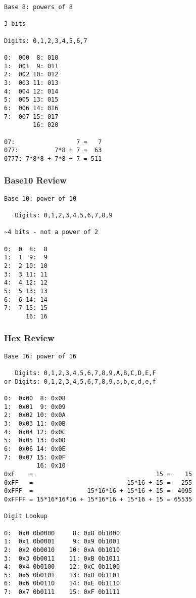 \documentclass[11pt]{article}
\begin{document}
\begin{verbatim}
Base 8: powers of 8

3 bits

Digits: 0,1,2,3,4,5,6,7

0:  000  8: 010
1:  001  9: 011   
2:  002 10: 012   
3:  003 11: 013   
4:  004 12: 014  
5:  005 13: 015  
6:  006 14: 016           
7:  007 15: 017  
        16: 020

07:                 7 =   7
077:          7*8 + 7 =  63
0777: 7*8*8 + 7*8 + 7 = 511
\end{verbatim}

\subsubsection{Base10 Review}
\label{sec:org4806b14}
\begin{verbatim}
Base 10: power of 10

   Digits: 0,1,2,3,4,5,6,7,8,9

~4 bits - not a power of 2

0:  0  8:  8
1:  1  9:  9   
2:  2 10: 10  
3:  3 11: 11  
4:  4 12: 12  
5:  5 13: 13 
6:  6 14: 14          
7:  7 15: 15 
      16: 16
\end{verbatim}

\subsubsection{Hex Review}
\label{sec:org96608aa}

\begin{verbatim}
Base 16: power of 16

   Digits: 0,1,2,3,4,5,6,7,8,9,A,B,C,D,E,F
or Digits: 0,1,2,3,4,5,6,7,8,9,a,b,c,d,e,f

0:  0x00  8: 0x08
1:  0x01  9: 0x09   
2:  0x02 10: 0x0A  
3:  0x03 11: 0x0B   
4:  0x04 12: 0x0C  
5:  0x05 13: 0x0D  
6:  0x06 14: 0x0E           
7:  0x07 15: 0x0F  
         16: 0x10
0xF    =                                  15 =    15
0xFF   =                          15*16 + 15 =   255
0xFFF  =               15*16*16 + 15*16 + 15 =  4095
0xFFFF = 15*16*16*16 + 15*16*16 + 15*16 + 15 = 65535

Digit Lookup

0:  0x0 0b0000     8: 0x8 0b1000
1:  0x1 0b0001     9: 0x9 0b1001  
2:  0x2 0b0010    10: 0xA 0b1010 
3:  0x3 0b0011    11: 0xB 0b1011  
4:  0x4 0b0100    12: 0xC 0b1100 
5:  0x5 0b0101    13: 0xD 0b1101 
6:  0x6 0b0110    14: 0xE 0b1110          
7:  0x7 0b0111    15: 0xF 0b1111 
\end{verbatim}
\end{document}

